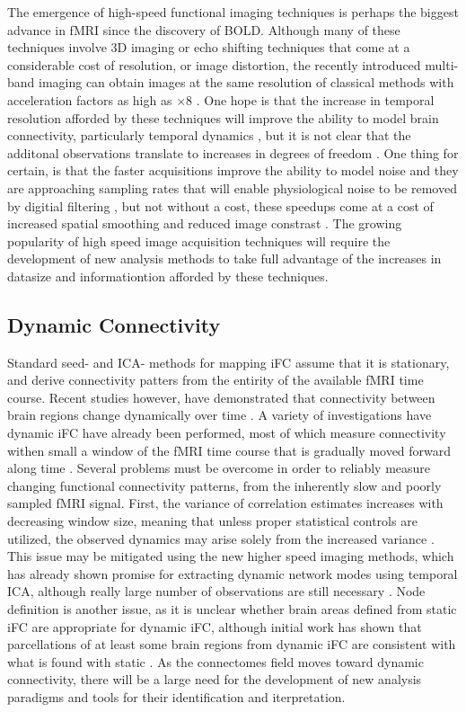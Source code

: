 The emergence of high-speed functional imaging techniques is perhaps the biggest advance in fMRI since the discovery of BOLD. Although many of these techniques involve 3D imaging \cite{glover, MRNguy} or echo shifting techniques \cite{PRESTO} that come at a considerable cost of resolution, or image distortion, the recently introduced multi-band imaging can obtain images at the same resolution of classical methods with acceleration factors as high as $\times8$ \cite{Feinberg}. One hope is that the increase in temporal resolution afforded by these techniques will improve the ability to model brain connectivity, particularly temporal dynamics \cite{smithTICA}, but it is not clear that the additonal observations translate to increases in degrees of freedom \cite{MRNguy}. One thing for certain, is that the faster acquisitions improve the ability to model noise and they are approaching sampling rates that will enable physiological noise to be removed by digitial filtering \cite{beckmann}, but not without a cost, these speedups come at a cost of increased spatial smoothing and reduced image constrast \cite{needfind}. The growing popularity of high speed image acquisition techniques will require the development of new analysis methods to take full advantage of the increases in datasize and informationtion afforded by these techniques.

\subsection{Dynamic Connectivity}

Standard seed- and ICA- methods for mapping iFC assume that it is stationary, and derive connectivity patters from the entirity of the available fMRI time course. Recent studies however, have demonstrated that connectivity between brain regions change dynamically over time \cite{Chang, Keilholz, Hutchinson2013, Fu2013}. A variety of investigations have dynamic iFC have already been performed, most of which measure connectivity withen small a window of the fMRI time course that is gradually moved forward along time \cite{}. Several problems must be overcome in order to reliably measure changing functional connectivity patterns, from the inherently slow and poorly sampled fMRI signal. First, the variance of correlation estimates increases with decreasing window size, meaning that unless proper statistical controls are utilized, the observed dynamics may arise solely from the increased variance \cite{}. This issue may be mitigated using the new higher speed imaging methods, which has already shown promise for extracting dynamic network modes using temporal ICA, although really large number of observations are still necessary \cite{Smith2012}. Node definition is another issue, as it is unclear whether brain areas defined from static iFC are appropriate for dynamic iFC, although initial work has shown that parcellations of at least some brain regions from dynamic iFC are consistent with what is found with static \cite{Yang2013}. As the connectomes field moves toward dynamic connectivity, there will be a large need for the development of new analysis paradigms and tools for their identification and iterpretation. 

